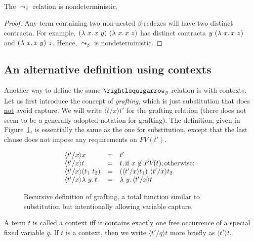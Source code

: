 \begin{lemma}
  The $\leadsto_\beta$ relation is nondeterministic.
\end{lemma}
\begin{proof}
  Any term containing two non-nested $\beta$-redexes will have
  two distinct contracta.  For example, $(\lambda\ x.\, x\ y)\ (\lambda\ x.\, x\ z)$
  has distinct contracta $y\ (\lambda\ x.\, x\ z)$ and $(\lambda\ x.\, x\ y)\ z$.
  Hence, $\leadsto_\beta$ is nondeterministic.
\end{proof}

\subsection{An alternative definition using contexts}

Another way to define the same $\curva_\beta$ relation is with
contexts.  Let us first introduce the concept of \emph{grafting},
which is just substitution that does \underline{not} avoid
capture.  We will write $\langle t/x\rangle t'$ for
the grafting relation (there does not seem to be a generally adopted
notation for grafting).  The definition, given in
Figure~\ref{fig:grafting}, is essentially the same as the one for substitution,
except that the last clause does not impose
any requirements on $\textit{FV}(t')$.

\begin{figure}
\large
\[
  \begin{array}{lll}
\    \langle t'/x \rangle x & = & t' \\
\    \langle t'/x \rangle t & = & t, \textnormal{if }x\not\in\textit{FV}(t); \textnormal{otherwise:} \\
\    \langle t'/x \rangle(t_1\ t_2) & = & (\langle t'/x\rangle t_1)\ \langle t'/x\rangle t_2 \\
\    \langle t'/x\rangle\lambda\ y.\, t & = & \lambda\ y.\, \langle t'/x\rangle t
  \end{array}
\]
  \caption{Recursive definition of grafting, a total function similar to substitution but intentionally allowing variable capture.}
  \label{fig:grafting}
  \end{figure}

\begin{definition}[context]
  A term $t$ is called a context iff it contains exactly one free
  occurrence of a special fixed variable $q$.  If $t$
  is a context, then we write $\langle t'/q \rangle t$ more briefly as
  $\langle t' \rangle t$.
  \end{definition}


